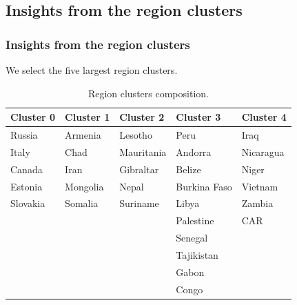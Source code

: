 \documentclass[
	11pt, %
]{beamer}
\begin{document}
\subsection{Insights from the region clusters}
\begin{frame}
\frametitle{Insights from the region clusters}
We select the five largest region clusters.

\begin{table}[H]
\smaller
\centering
\begin{tabular}{|l|l|l|l|l|}
\hline
Cluster 0 & Cluster 1                 & Cluster 2  & Cluster 3           & Cluster 4                \\ \hline
Russia    & Armenia                   & Lesotho    & Peru                & Iraq                     \\ \hline
Italy     & Chad                      & Mauritania & Andorra             & Nicaragua                \\ \hline
Canada    & Iran  & Gibraltar  & Belize              & Niger                    \\ \hline
Estonia   & Mongolia                  & Nepal      & Burkina Faso        & Vietnam                  \\ \hline
Slovakia  & Somalia                   & Suriname   & Libya               & Zambia                   \\ \hline
          &                           &            & Palestine & CAR \\ \hline
          &                           &            & Senegal             &                          \\ \hline
          &                           &            & Tajikistan          &                          \\ \hline
          &                           &            & Gabon               &                          \\ \hline
          &                           &            & Congo               &                          \\ \hline
\end{tabular}
\caption{Region clusters composition.}
\label{table:clusters_region}
\end{table}

\end{frame}
\end{document}
